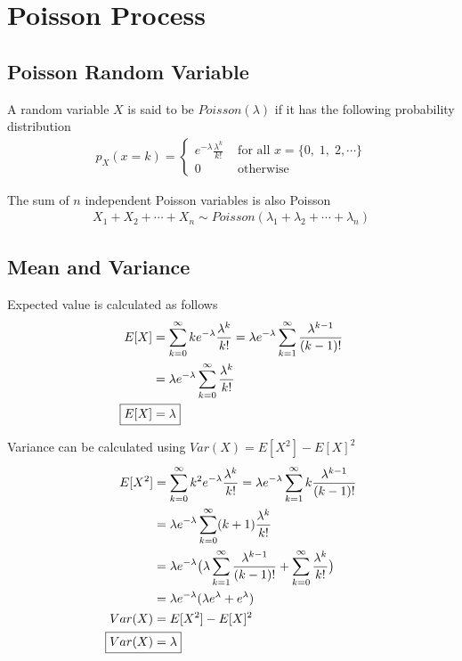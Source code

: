 \documentclass[../../probability-notes.tex]{subfiles}
\begin{document}
    \section{Poisson Process}
    \subsection{Poisson Random Variable}
    A random variable $X$ is said to be $Poisson(\lambda)$ if it has the following probability distribution
    \begin{align*}
        p_{X}(x = k) = \begin{cases} e^{-\lambda} \frac{\lambda^{k}}{k!} &\text{ for all } x = \{ 0,\;1,\;2, \cdots \}\\
                                    0 &\text{ otherwise} \end{cases}
    \end{align*}

    The sum of $n$ independent Poisson variables is also Poisson
    \begin{align*}
        X_{1} + X_{2} + \cdots + X_{n} \sim Poisson(\lambda_{1} + \lambda_{2} + \cdots + \lambda_{n})
    \end{align*}

    \subsection{Mean and Variance}
    Expected value is calculated as follows
    \begin{align*}
        E[X] &= \sum_{k=0}^{\infty} ke^{-\lambda} \frac{\lambda^{k}}{k!} = \lambda e^{-\lambda} \sum_{k=1}^{\infty} \frac{\lambda^{k-1}}{(k-1)!}\\
        &= \lambda e^{-\lambda} \sum_{k=0}^{\infty} \frac{\lambda^{k}}{k!}\\
        \Aboxed{E[X] &= \lambda}
    \end{align*}

    Variance can be calculated using $Var(X) = E[X^{2}] - E[X]^{2}$
    \begin{align*}
        E[X^{2}] &= \sum_{k=0}^{\infty} k^{2} e^{-\lambda} \frac{\lambda^{k}}{k!} = \lambda e^{-\lambda} \sum_{k=1}^{\infty} k\frac{\lambda^{k-1}}{(k-1)!}\\
        &= \lambda e^{-\lambda} \sum_{k=0}^{\infty} (k+1) \frac{\lambda^{k}}{k!}\\
        &= \lambda e^{-\lambda} \big( \lambda \sum_{k=1}^{\infty} \frac{\lambda^{k-1}}{(k-1)!} + \sum_{k=0}^{\infty} \frac{\lambda^{k}}{k!} \big)\\
        &= \lambda e^{-\lambda} (\lambda e^{\lambda} + e^{\lambda})\\
        Var(X) &= E[X^{2}] - E[X]^{2}\\
        \Aboxed{Var(X) &= \lambda}
    \end{align*}
\end{document}
